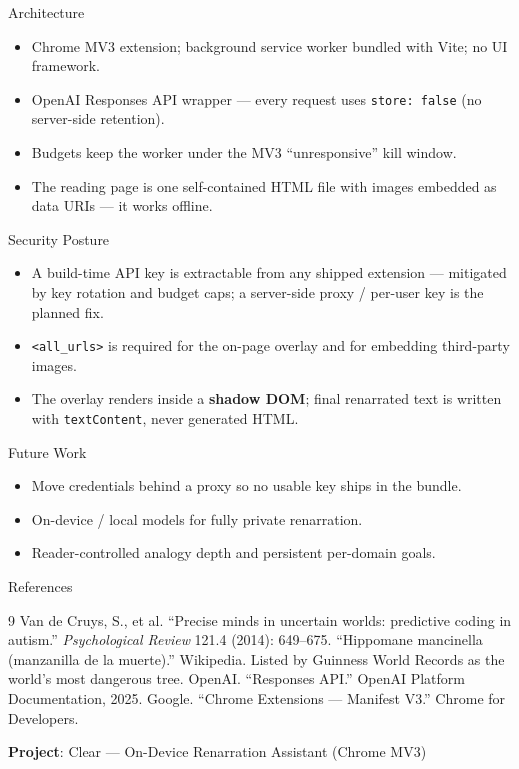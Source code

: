 \documentclass[final]{beamer}
\newlength{\onecolwid}
\begin{document}
\begin{frame}[t]
\begin{columns}[t]
\begin{column}{\onecolwid}
\begin{block}{Architecture}
\begin{itemize}
\item Chrome MV3 extension; background service worker bundled with Vite; no UI framework.
\item OpenAI Responses API wrapper — every request uses \texttt{store:\,false} (no server-side retention).
\item Budgets keep the worker under the MV3 ``unresponsive'' kill window.
\item The reading page is one self-contained HTML file with images embedded as data URIs — it works offline.
\end{itemize}
\end{block}

\begin{block}{Security Posture}
\begin{itemize}
\item A build-time API key is extractable from any shipped extension — mitigated by key rotation and budget caps; a server-side proxy / per-user key is the planned fix.
\item \texttt{<all\_urls>} is required for the on-page overlay and for embedding third-party images.
\item The overlay renders inside a \textbf{shadow DOM}; final renarrated text is written with \texttt{textContent}, never generated HTML.
\end{itemize}
\end{block}

\begin{block}{Future Work}
\begin{itemize}
\item Move credentials behind a proxy so no usable key ships in the bundle.
\item On-device / local models for fully private renarration.
\item Reader-controlled analogy depth and persistent per-domain goals.
\end{itemize}
\end{block}

\begin{block}{References}
\begin{thebibliography}{9}
\footnotesize
{} Van de Cruys, S., et al. ``Precise minds in uncertain worlds: predictive coding in autism.'' \textit{Psychological Review} 121.4 (2014): 649--675.
 ``Hippomane mancinella (manzanilla de la muerte).'' Wikipedia. Listed by Guinness World Records as the world's most dangerous tree.
 OpenAI. ``Responses API.'' OpenAI Platform Documentation, 2025.
 Google. ``Chrome Extensions — Manifest V3.'' Chrome for Developers.
\end{thebibliography}
\vspace*{0.2in}
\footnotesize{\centerline{\textbf{Project}: Clear — On-Device Renarration Assistant (Chrome MV3)}}
\end{block}


\end{column}
\end{columns}
\end{frame}
\end{document}
